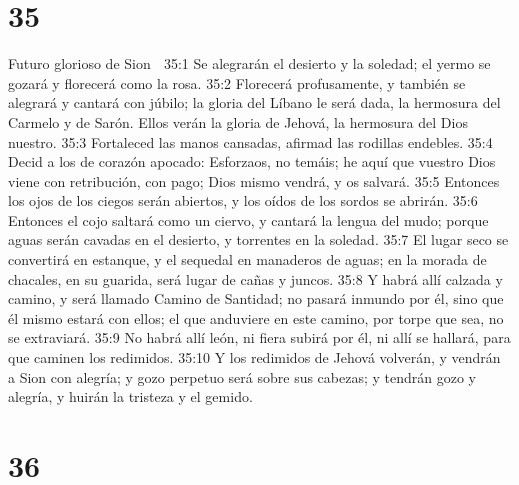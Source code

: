 \chapter{35}

Futuro glorioso de Sion  

35:1 Se alegrarán el desierto y la soledad; el yermo se gozará y florecerá como la rosa.  
35:2 Florecerá profusamente, y también se alegrará y cantará con júbilo; la gloria del Líbano le será dada, la hermosura del Carmelo y de Sarón. Ellos verán la gloria de Jehová, la hermosura del Dios nuestro.  
35:3 Fortaleced las manos cansadas, afirmad las rodillas endebles. 
35:4 Decid a los de corazón apocado: Esforzaos, no temáis; he aquí que vuestro Dios viene con retribución, con pago; Dios mismo vendrá, y os salvará.  
35:5 Entonces los ojos de los ciegos serán abiertos, y los oídos de los sordos se abrirán.  
35:6 Entonces el cojo saltará como un ciervo, y cantará la lengua del mudo; porque aguas serán cavadas en el desierto, y torrentes en la soledad.  
35:7 El lugar seco se convertirá en estanque, y el sequedal en manaderos de aguas; en la morada de chacales, en su guarida, será lugar de cañas y juncos.  
35:8 Y habrá allí calzada y camino, y será llamado Camino de Santidad; no pasará inmundo por él, sino que él mismo estará con ellos; el que anduviere en este camino, por torpe que sea, no se extraviará.  
35:9 No habrá allí león, ni fiera subirá por él, ni allí se hallará, para que caminen los redimidos.  
35:10 Y los redimidos de Jehová volverán, y vendrán a Sion con alegría; y gozo perpetuo será sobre sus cabezas; y tendrán gozo y alegría, y huirán la tristeza y el gemido. 

\chapter{36}

